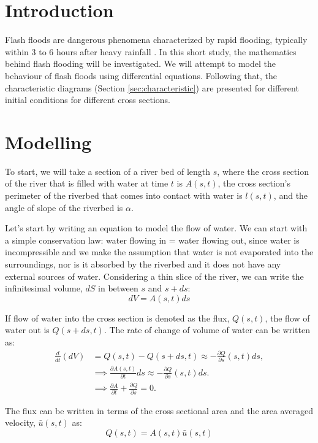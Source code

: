\documentclass[12pt]{article}
\begin{document}
\section{Introduction}
Flash floods are dangerous phenomena characterized by rapid flooding, typically within 3 to 6 hours after heavy rainfall \cite{national-oceanic-and-atmospheric-administration-no-date}. In this short study, the mathematics behind flash flooding will be investigated. We will attempt to model the behaviour of flash floods using differential equations. Following that, the characteristic diagrams (Section \ref{sec:characteristic}) are presented for different initial conditions for different cross sections.

\section{Modelling}
To start, we will take a section of a river bed of length $s$, where the cross section of the river that is filled with water at time $t$ is $A(s, t)$, the cross section's perimeter of the riverbed that comes into contact with water is $l(s, t)$, and the angle of slope of the riverbed is $\alpha$. 

Let's start by writing an equation to model the flow of water. We can start with a simple conservation law: water flowing in = water flowing out, since  water is incompressible and we make the assumption that water is not evaporated into the surroundings, nor is it absorbed by the riverbed and it does not  have any external sources of water. Considering a thin slice of the river, we can write the infinitesimal volume, $dS$ in between $s$ and $s + ds$:
\begin{equation}
    dV = A(s,t)ds
\end{equation}

If flow of water into the cross section is denoted as the flux, $Q(s, t)$, the flow of water out is $Q(s +  ds, t)$. The rate of change of volume of water can be written as:
\begin{align}
    \frac{d}{dt}(dV) &= Q(s,t) - Q(s+ds,t) \approx -\frac{\partial Q}{\partial s}(s,t)ds, \\
    &\implies \frac{\partial A(s,t)}{\partial t}ds \approx -\frac{\partial Q}{\partial s}(s,t)ds.
    \\ &\implies \frac{\partial A}{\partial t} + \frac{\partial Q}{\partial s} =0. \label{PDE general}
\end{align}

The flux can be written in terms of the cross sectional area and the area averaged velocity, $\bar{u}(s, t)$ as:
\begin{equation}
    Q(s,t) = A(s, t) \bar{u}(s, t)
    \label{eqn:qAu}
\end{equation}
\end{document}
